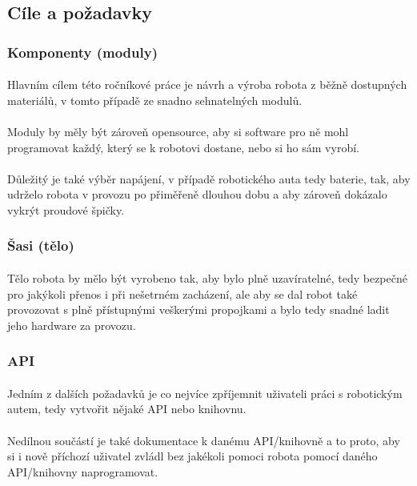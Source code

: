 \documentclass[12pt]{article}
\begin{document}
\begin{spacing}{1.5}
	\subsection{Cíle a požadavky}
	
	\subsubsection{Komponenty (moduly)}
	\paragraph{} Hlavním cílem této ročníkové práce je návrh a výroba robota z běžně dostupných materiálů, v tomto případě ze snadno sehnatelných modulů.
	\paragraph{} Moduly by měly být zároveň opensource, aby si software pro ně mohl programovat každý, který se k robotovi dostane, nebo si ho sám vyrobí.
	\paragraph{} Důležitý je také výběr napájení, v případě robotického auta tedy baterie, tak, aby udrželo robota v provozu po přiměřeně dlouhou dobu a aby zároveň dokázalo vykrýt proudové špičky.
	
	\subsubsection{Šasi (tělo)}
	\paragraph{} Tělo robota by mělo být vyrobeno tak, aby bylo plně uzavíratelné, tedy bezpečné pro jakýkoli přenos i při nešetrném zacházení, ale aby se dal robot také provozovat s plně přístupnými veškerými propojkami a bylo tedy snadné ladit jeho hardware za provozu.
	
	\subsubsection{API}
	\paragraph{} Jedním z dalších požadavků je co nejvíce zpříjemnit uživateli práci s robotickým autem, tedy vytvořit nějaké API nebo knihovnu.
	\paragraph{} Nedílnou součástí je také dokumentace k danému API/knihovně a to proto, aby si i nově příchozí uživatel zvládl bez jakékoli pomoci robota pomocí daného API/knihovny naprogramovat.
	

\end{spacing}
\end{document}
